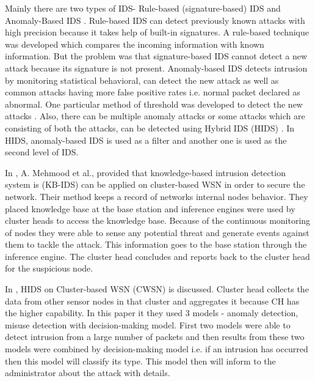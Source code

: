 \noindent
Mainly there are two types of IDS- Rule-based (signature-based) IDS and Anomaly-Based IDS \cite{khan2010framework}. Rule-based IDS can detect previously known attacks with high precision because it takes help of built-in signatures. A rule-based technique was developed \cite{jha2002building} which compares the incoming information with known information. But the problem was that signature-based IDS cannot detect a new attack because its signature is not present. Anomaly-based IDS detects intrusion by monitoring statistical behavioral, can detect the new attack as well as common attacks having more false positive rates i.e. normal packet declared as abnormal. One particular method of threshold was developed to detect the new attacks \cite{xie2011anomaly}. Also, there can be multiple anomaly attacks or some attacks which are consisting of both the attacks, can be detected using Hybrid IDS (HIDS) \cite{sedjelmaci2011novel}. In HIDS, anomaly-based IDS is used as a filter and another one is used as the second level of IDS.
\par
In \cite{mehmood2018secure}, A. Mehmood et al., provided that knowledge-based intrusion detection system is (KB-IDS) can be applied on cluster-based WSN in order to secure the network. Their method keeps a record of networks internal nodes behavior. They placed knowledge base at the base station and inference engines were used by cluster heads to access the knowledge base. Because of the continuous monitoring of nodes they were able to sense any potential threat and generate events against them to tackle the attack. This information goes to the base station through the inference engine. The cluster head concludes and reports back to the cluster head for the suspicious node.
\par
In \cite{yan2009hybrid}, HIDS on Cluster-based WSN (CWSN) is discussed. Cluster head collects the data from other sensor nodes in that cluster and aggregates it because CH has the higher capability. In this paper it they used 3 models - anomaly detection, misuse detection with decision-making model. First two models were able to detect intrusion from a large number of packets and then results from these two models were combined by decision-making model i.e. if an intrusion has occurred then this model will classify its type. This model then will inform to the administrator about the attack with details.
